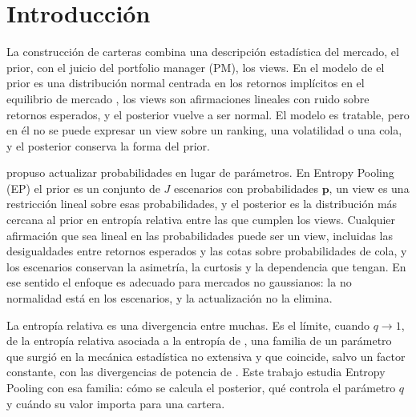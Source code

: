 \documentclass[11pt]{article}
\newcommand{\p}{\mathbf{p}}
\begin{document}
\onehalfspacing

\section{Introducci\'on}

La construcci\'on de carteras combina una descripci\'on estad\'istica del
mercado, el prior, con el juicio del portfolio manager (PM), los views. En
el modelo de \citet{BlackLitterman1992} el prior es una distribuci\'on normal
centrada en los retornos impl\'icitos en el equilibrio de mercado
\citep{HeLitterman2002}, los views son afirmaciones lineales con ruido sobre
retornos esperados, y el posterior vuelve a ser normal. El modelo es
tratable, pero en \'el no se puede expresar un view sobre un ranking, una
volatilidad o una cola, y el posterior conserva la forma del prior.

\citet{Meucci2008} propuso actualizar probabilidades en lugar de
par\'ametros. En Entropy Pooling (EP) el prior es un conjunto de $J$
escenarios con probabilidades $\p$, un view es una restricci\'on lineal sobre
esas probabilidades, y el posterior es la distribuci\'on m\'as cercana al
prior en entrop\'ia relativa entre las que cumplen los views. Cualquier
afirmaci\'on que sea lineal en las probabilidades puede ser un view, incluidas
las desigualdades entre retornos esperados y las cotas sobre probabilidades
de cola, y los escenarios conservan la asimetr\'ia, la curtosis y la
dependencia que tengan. En ese sentido el enfoque es adecuado para mercados
no gaussianos: la no normalidad est\'a en los escenarios, y la actualizaci\'on
no la elimina.

La entrop\'ia relativa es una divergencia entre muchas. Es el l\'imite, cuando
$q \to 1$, de la entrop\'ia relativa asociada a la entrop\'ia de
\citet{Tsallis1988} \citep{BorlandPlastinoTsallis1998}, una familia de un
par\'ametro que surgi\'o en la mec\'anica estad\'istica no extensiva
\citep{Tsallis2009} y que coincide, salvo un factor constante, con las
divergencias de potencia de \citet{CressieRead1984}. Este trabajo estudia
Entropy Pooling con esa familia: c\'omo se calcula el posterior, qu\'e
controla el par\'ametro $q$ y cu\'ando su valor importa para una cartera.
\end{document}
